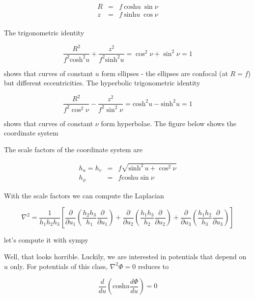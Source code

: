 \begin{eqnarray}
R &=& f \ \mathrm{cosh} u  \ \sin \nu\\
z &=& f \  \mathrm{sinh} u  \ \cos \nu\\
\end{eqnarray}


The trigonometric identity 

\begin{equation}
\frac{R^2}{f^2\mathrm{cosh}^2 u} + \frac{z^2}{f^2\mathrm{sinh}^2 u} = \cos^2\nu + \sin^2\nu = 1
\end{equation}


shows that curves of constant $u$ form ellipses - the ellipses are confocal (at $R=f$) but different eccentricities. The hyperbolic trigonometric identity

\begin{equation}
\frac{R^2}{f^2\cos^2\nu} - \frac{z^2}{f^2\sin^2\nu} = \mathrm{cosh}^2 u - \mathrm{sinh}^2 u = 1
\end{equation}

shows that curves of constant $\nu$ form hyperbolae. The figure below shows the coordinate system 


The scale factors of the coordinate system are 


\begin{eqnarray}
h_u = h_v &=& f\sqrt{\mathrm{sinh}^2 \, u + \cos^2\nu}\\
h_\phi &=& f \mathrm{cosh} u\sin\nu
\end{eqnarray}


With the scale factors we can compute the Laplacian 

\begin{equation}
\nabla^2 = \frac{1}{h_1h_2h_3} \left[ \frac{\partial}{\partial u_1} \left(\frac{h_2h_3}{h_1} \frac{\partial}{\partial u_1} \right)+\frac{\partial}{\partial u_2} \left(\frac{h_1h_3}{h_2} \frac{\partial}{\partial u_2} \right)+\frac{\partial}{\partial u_3} \left(\frac{h_1h_2}{h_3} \frac{\partial}{\partial u_3} \right)
\right]
\end{equation}


let's compute it with sympy 



Well, that looks horrible. Luckily, we are interested in potentials that depend on $u$ only. For potentials of this class, $\nabla^2 \varPhi = 0$  reduces to 


\begin{equation}
\frac{d}{du} \left( \mathrm{cosh} u \frac{d\varPhi}{du}\right)=0
\end{equation}

